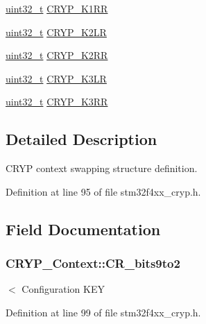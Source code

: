 \begin{DoxyCompactItemize}
\item 
\hyperlink{stdint_8h_a435d1572bf3f880d55459d9805097f62}{uint32\-\_\-t} \hyperlink{struct_c_r_y_p___context_aa89211f0d83d04be2578e8f56c72669c}{C\-R\-Y\-P\-\_\-\-K1\-R\-R}
\item 
\hyperlink{stdint_8h_a435d1572bf3f880d55459d9805097f62}{uint32\-\_\-t} \hyperlink{struct_c_r_y_p___context_a26fcb379bb56528df2cfabde8120b5f7}{C\-R\-Y\-P\-\_\-\-K2\-L\-R}
\item 
\hyperlink{stdint_8h_a435d1572bf3f880d55459d9805097f62}{uint32\-\_\-t} \hyperlink{struct_c_r_y_p___context_a2d49a621f48e73d1486ec1e719e2159e}{C\-R\-Y\-P\-\_\-\-K2\-R\-R}
\item 
\hyperlink{stdint_8h_a435d1572bf3f880d55459d9805097f62}{uint32\-\_\-t} \hyperlink{struct_c_r_y_p___context_ab64a851c884d0506021f49cf057ec4aa}{C\-R\-Y\-P\-\_\-\-K3\-L\-R}
\item 
\hyperlink{stdint_8h_a435d1572bf3f880d55459d9805097f62}{uint32\-\_\-t} \hyperlink{struct_c_r_y_p___context_ae4cd1a3b6090d7305f0290cdee25cd5b}{C\-R\-Y\-P\-\_\-\-K3\-R\-R}
\end{DoxyCompactItemize}


\subsection{Detailed Description}
C\-R\-Y\-P context swapping structure definition. 

Definition at line 95 of file stm32f4xx\-\_\-cryp.\-h.



\subsection{Field Documentation}
\hypertarget{struct_c_r_y_p___context_ad8cccfe37789c5a9054cbe8a7164d897}{
\subsubsection[{C\-R\-\_\-bits9to2}]{ C\-R\-Y\-P\-\_\-\-Context\-::\-C\-R\-\_\-bits9to2}}\label{struct_c_r_y_p___context_ad8cccfe37789c5a9054cbe8a7164d897}
$<$ Configuration K\-E\-Y 

Definition at line 99 of file stm32f4xx\-\_\-cryp.\-h.

